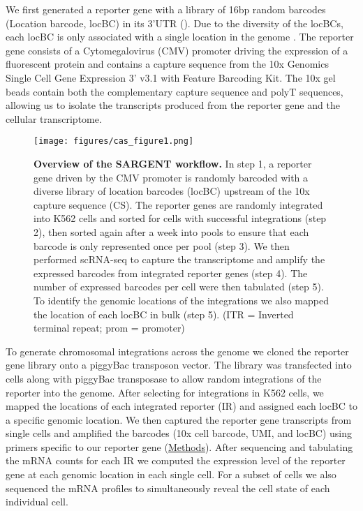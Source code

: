 We first generated a reporter gene with a library of 16bp random barcodes (Location barcode, locBC) in its 3’UTR (). Due to the diversity of the locBCs, each locBC is only associated with a single location in the genome \cite{akhtarw_vansteenselb:ChromatinPosition2013}. The reporter gene consists of a Cytomegalovirus (CMV) promoter driving the expression of a fluorescent protein and contains a capture sequence from the 10x Genomics Single Cell Gene Expression 3' v3.1 with Feature Barcoding Kit. The 10x gel beads contain both the complementary capture sequence and polyT sequences, allowing us to isolate the transcripts produced from the reporter gene and the cellular transcriptome. 

\begin{figure}[tb]  
    \centering
    \texttt{[image: figures/cas\_figure1.png]}
    \caption[Overview of the SARGENT workflow.]{%
        \textbf{Overview of the SARGENT workflow.}
         In step 1, a reporter gene driven by the CMV promoter is randomly barcoded with a diverse library of location barcodes (locBC) upstream of the 10x capture sequence (CS). The reporter genes are randomly integrated into K562 cells and sorted for cells with successful integrations (step 2), then sorted again after a week into pools to ensure that each barcode is only represented once per pool (step 3). We then performed scRNA-seq to capture the transcriptome and amplify the expressed barcodes from integrated reporter genes (step 4). The number of expressed barcodes per cell were then tabulated (step 5). To identify the genomic locations of the integrations we also mapped the location of each locBC in bulk (step 5). (ITR = Inverted terminal repeat; prom = promoter)
    }
    \label{fig:cas_figure1}
\end{figure}

To generate chromosomal integrations across the genome we cloned the reporter gene library onto a piggyBac transposon vector. The library was transfected into cells along with piggyBac transposase to allow random integrations of the reporter into the genome. After selecting for integrations in K562 cells, we mapped the locations of each integrated reporter (IR) and assigned each locBC to a specific genomic location. We then captured the reporter gene transcripts from single cells and amplified the barcodes (10x cell barcode, UMI, and locBC) using primers specific to our reporter gene (\hyperref[section:cas_methods]{Methods}). After sequencing and tabulating the mRNA counts for each IR we computed the expression level of the reporter gene at each genomic location in each single cell. For a subset of cells we also sequenced the mRNA profiles to simultaneously reveal the cell state of each individual cell.


